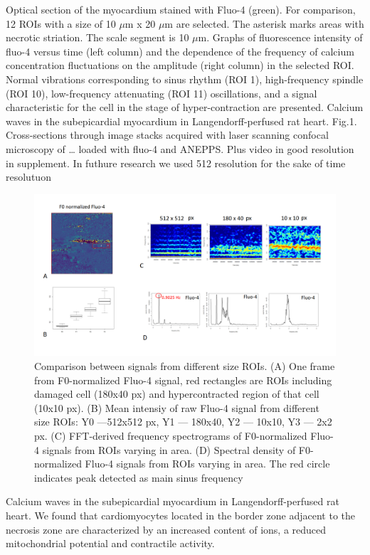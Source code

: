 \documentclass{biophys-new}
\begin{document}
Optical section of the myocardium stained with Fluo-4 (green).
For comparison, 12 ROIs with a size of 10 $\mu$m x 20 $\mu$m are selected.
The asterisk marks areas with necrotic striation. The scale segment is 10 $\mu$m.
Graphs of fluorescence intensity of fluo-4 versus time (left column) and the dependence of the frequency of calcium concentration fluctuations on the amplitude (right column) in the selected ROI.
Normal vibrations corresponding to sinus rhythm (ROI 1), high-frequency spindle (ROI 10), low-frequency attenuating (ROI 11) oscillations, and a signal characteristic for the cell in the stage of hyper-contraction are presented.
Calcium waves in the subepicardial myocardium in Langendorff-perfused rat heart. Fig.1. Cross-sections through image stacks acquired with laser scanning confocal microscopy of … loaded with fluo-4 and ANEPPS.
Plus video in good resolution in supplement. In futhure research we used 512 resolution for the sake of time resolutuon


\begin{figure}
    \includegraphics[width=0.9\linewidth]{fig3.png}
    \caption{Comparison between signals from different size ROIs. (A) One frame from F0-normalized Fluo-4 signal, red rectangles are  ROIs including damaged cell (180x40 px) and hypercontracted region of that cell (10x10 px). (B) Mean intensiy of raw Fluo-4 signal from different size ROIs: Y0 ---512x512 px, Y1 --- 180x40, Y2 --- 10x10, Y3 --- 2x2 px. (C) FFT-derived frequency spectrograms of F0-normalized Fluo-4 signals from ROIs varying in area. (D) Spectral density of F0-normalized Fluo-4 signals from ROIs varying in area. The red circle indicates peak detected as main sinus frequency }
    \label{fig:fig3}
\end{figure}

Calcium waves in the subepicardial myocardium in Langendorff-perfused rat heart.
We found that cardiomyocytes located in the border zone adjacent to the necrosis zone are characterized by an increased content of  ions, a reduced mitochondrial potential and contractile activity.
\end{document}
